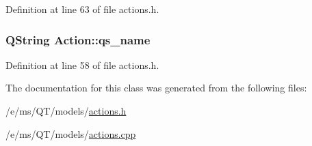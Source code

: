 Definition at line 63 of file actions.h.

\hypertarget{classAction_ac3d7cf76ccbb09e443681b14b7326010}{
\subsubsection[{qs\_\-name}]{\setlength{\rightskip}{0pt plus 5cm}QString {\bf Action::qs\_\-name}}}
\label{classAction_ac3d7cf76ccbb09e443681b14b7326010}


Definition at line 58 of file actions.h.



The documentation for this class was generated from the following files:\begin{DoxyCompactItemize}
\item 
/e/ms/QT/models/\hyperlink{actions_8h}{actions.h}\item 
/e/ms/QT/models/\hyperlink{actions_8cpp}{actions.cpp}\end{DoxyCompactItemize}

